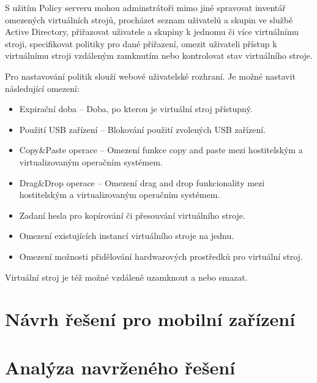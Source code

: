 S užitím Policy serveru mohou adminstrátoři mimo jiné spravovat inventář omezených virtuálních strojů, procházet seznam uživatelů a skupin ve službě Active Directory, přiřazovat uživatele a skupiny k jednomu či více virtuálnímu stroji, specifikovat politiky pro dané přiřazení, omezit uživateli přístup k virtuálnímu stroji vzdáleným zamknutím nebo kontrolovat stav virtuálního stroje.

Pro nastavování politik slouží webové uživatelské rozhraní. Je možné nastavit následující omezení:

\begin{itemize}
    \item Expirační doba -- Doba, po kterou je virtuální stroj přístupný.
    \item Použití USB zařízení -- Blokování použití zvolených USB zařízení.
    \item Copy\&Paste operace -- Omezení funkce copy and paste mezi hostitelským a virtualizovaným operačním systémem.
    \item Drag\&Drop operace -- Omezení drag and drop funkcionality mezi hostitelským a virtualizovaným operačním systémem.
    \item Zadaní hesla pro kopírování či přesouvání virtuálního stroje.
    \item Omezení existujících instancí virtuálního stroje na jednu.
    \item Omezení možnosti přidělování hardwarových prostředků pro virtuální stroj.
\end{itemize}

Virtuální stroj je též možné vzdáleně uzamknout a nebo smazat.

\section{Návrh řešení pro mobilní zařízení}



\section{Analýza navrženého řešení}